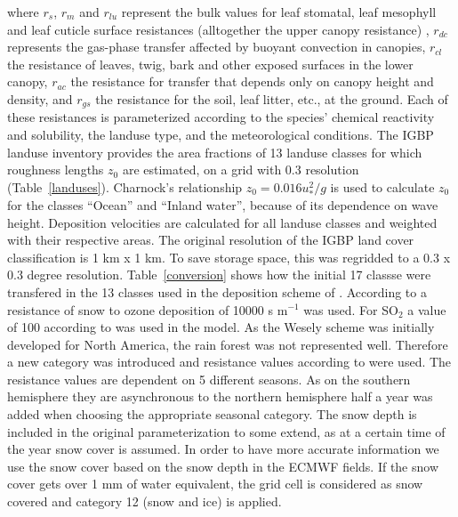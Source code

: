 \documentclass{egu}            %
\begin{document}
where $r_s$, $r_m$ and $r_{lu}$ represent the bulk values for leaf stomatal,
leaf mesophyll and leaf cuticle surface resistances (alltogether the upper
canopy resistance) , $r_{dc}$ represents the gas-phase transfer affected by
buoyant convection in canopies, $r_{cl}$ the resistance of leaves, twig, bark
and other exposed surfaces in the lower canopy, $r_{ac}$ the resistance for
transfer that depends only on canopy height and density, and $r_{gs}$ the
resistance for the soil, leaf litter, etc., at the ground.  Each of these
resistances is parameterized according to the species' chemical reactivity and
solubility, the landuse type, and the meteorological conditions.  The IGBP
landuse inventory \citep{belward1999} provides the area fractions of 13 landuse
classes for which roughness lengths $z_0$ are estimated, on a grid with 0.3
resolution (Table~\ref{landuses}).  Charnock's relationship \citep{stull1988}
$z_0=0.016u_*^2/g$ is used to calculate $z_0$ for the classes ``Ocean'' and
``Inland water'', because of its dependence on wave height.  Deposition
velocities are calculated for all landuse classes and weighted with their
respective areas.  The original resolution of the IGBP land cover
classification is 1 km x 1 km.  To save storage space, this was regridded to a
0.3 x 0.3 degree resolution.  Table~\ref{conversion} shows how the initial 17
classse were transfered in the 13 classes used in the deposition scheme of
\cite{wesely1989}.  According to \cite{helmig2007} a resistance of snow to
ozone deposition of 10000 s m$^{-1}$ was used.  For SO$_2$ a value of 100
according to \citet{zhang2002} was used in the model.  As the Wesely scheme was
initially developed for North America, the rain forest was not represented
well.  Therefore a new category was introduced and resistance values according
to \cite{jacob1990} were used.  The resistance values are dependent on 5
different seasons.  As on the southern hemisphere they are asynchronous to the
northern hemisphere half a year was added when choosing the appropriate
seasonal category.  The snow depth is included in the original
\cite{wesely1989} parameterization to some extend, as at a certain time of the
year snow cover is assumed.  In order to have more accurate information we use
the snow cover based on the snow depth in the ECMWF fields.  If the snow cover
gets over 1 mm of water equivalent, the grid cell is considered as snow covered
and category 12 (snow and ice) is applied.
\end{document}
